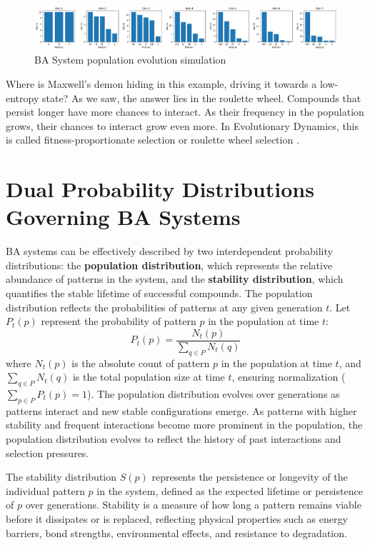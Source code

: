 \documentclass[entropy,article,submit,pdftex,moreauthors]{Definitions/mdpi}
\begin{document}
\begin{figure}[htp]
    \centering
    \includegraphics[width=13cm]{pat_1}
    \caption{BA System population evolution simulation}
    \label{fig:pat_1}
\end{figure}

Where is Maxwell's demon \cite{leff2002maxwell} hiding in this example, driving it towards a low-entropy state? As we saw, the answer lies in the roulette wheel. Compounds that persist longer have more chances to interact. As their frequency in the population grows, their chances to interact grow even more. In Evolutionary Dynamics, this is called fitness-proportionate selection \cite{back1996evolutionary} or roulette wheel selection \cite{goldberg1989genetic} \cite{holland1975adaptation}.

\section{Dual Probability Distributions Governing BA Systems}

BA systems can be effectively described by two interdependent probability distributions: the \textbf{population distribution}, which represents the relative abundance of patterns in the system, and the \textbf{stability distribution}, which quantifies the stable lifetime of successful compounds. The population distribution reflects the probabilities of patterns at any given generation \( t \). Let \( P_t(p) \) represent the probability of pattern \( p \) in the population at time \( t \):
\[
P_t(p) = \frac{N_t(p)}{\sum_{q \in P} N_t(q)}
\]
where \( N_t(p) \) is the absolute count of pattern \( p \) in the population at time \( t \), and \( \sum_{q \in P} N_t(q) \) is the total population size at time \( t \), ensuring normalization (\( \sum_{p \in P} P_t(p) = 1 \)). The population distribution evolves over generations as patterns interact and new stable configurations emerge. As patterns with higher stability and frequent interactions become more prominent in the population, the population distribution evolves to reflect the history of past interactions and selection pressures.

The stability distribution \( S(p) \) represents the persistence or longevity of the individual pattern \( p \) in the system, defined as the expected lifetime or persistence of \( p \) over generations. Stability is a measure of how long a pattern remains viable before it dissipates or is replaced, reflecting physical properties such as energy barriers, bond strengths, environmental effects, and resistance to degradation.
\end{document}
